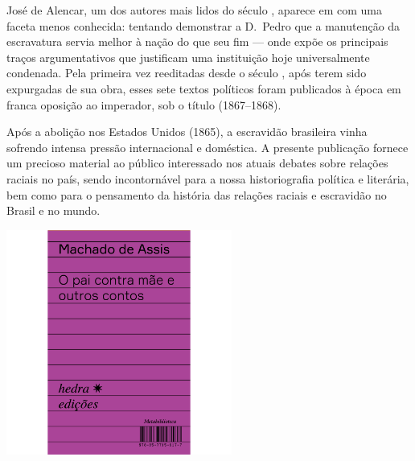 \hspace*{-7cm}\hrulefill\hspace*{-7cm}

\medskip

\noindent{}José de Alencar, um dos autores mais lidos do século , aparece em {} com uma faceta menos conhecida: tentando demonstrar a D.~Pedro  que a manutenção da escravatura servia melhor à nação do que seu fim --- onde expõe os principais traços argumentativos que justificam uma instituição hoje universalmente condenada. Pela primeira vez reeditadas desde o século , após terem sido expurgadas de sua obra, esses sete textos políticos foram publicados à época em franca oposição ao imperador, sob o título {} (1867--1868).

Após a abolição nos Estados Unidos (1865), a escravidão brasileira vinha sofrendo intensa pressão internacional e doméstica. A presente publicação fornece um precioso material ao público interessado nos atuais debates sobre relações raciais no país, sendo incontornável para a nossa historiografia política e literária, bem como para o pensamento da história das relações raciais e escravidão no Brasil e no mundo.

\vfill

\hspace*{-.4cm}\begin{minipage}[c]{.5\linewidth}
\small{
{}}
\end{minipage}

\pagebreak

\begin{center}
\hspace*{-3.6cm}
\hspace*{3.1cm}\includegraphics[width=74mm]{./grid/machado.jpg}
\end{center}

